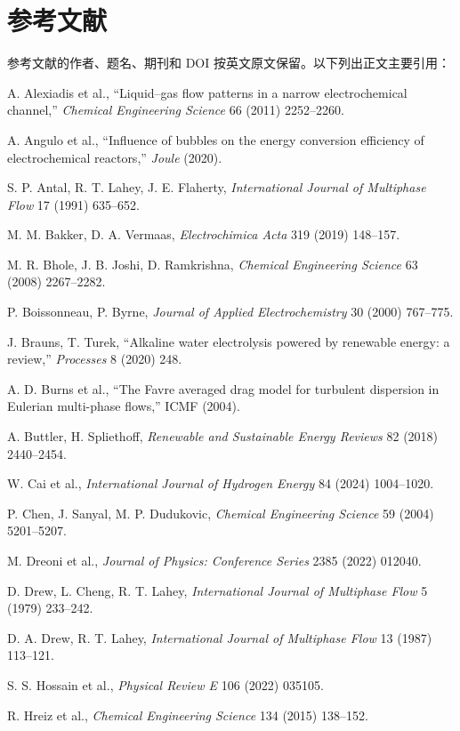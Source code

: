 \documentclass[UTF8,zihao=-4,fontset=fandol]{ctexart}
\begin{document}
\section*{参考文献}
\small
参考文献的作者、题名、期刊和 DOI 按英文原文保留。以下列出正文主要引用：
\begin{enumerate}[label={[\arabic*]},leftmargin=2.7em,itemsep=0.12em]
\item A. Alexiadis et al., ``Liquid--gas flow patterns in a narrow electrochemical channel,'' \emph{Chemical Engineering Science} 66 (2011) 2252--2260.
\item A. Angulo et al., ``Influence of bubbles on the energy conversion efficiency of electrochemical reactors,'' \emph{Joule} (2020).
\item S. P. Antal, R. T. Lahey, J. E. Flaherty, \emph{International Journal of Multiphase Flow} 17 (1991) 635--652.
\item M. M. Bakker, D. A. Vermaas, \emph{Electrochimica Acta} 319 (2019) 148--157.
\item M. R. Bhole, J. B. Joshi, D. Ramkrishna, \emph{Chemical Engineering Science} 63 (2008) 2267--2282.
\item P. Boissonneau, P. Byrne, \emph{Journal of Applied Electrochemistry} 30 (2000) 767--775.
\item J. Brauns, T. Turek, ``Alkaline water electrolysis powered by renewable energy: a review,'' \emph{Processes} 8 (2020) 248.
\item A. D. Burns et al., ``The Favre averaged drag model for turbulent dispersion in Eulerian multi-phase flows,'' ICMF (2004).
\item A. Buttler, H. Spliethoff, \emph{Renewable and Sustainable Energy Reviews} 82 (2018) 2440--2454.
\item W. Cai et al., \emph{International Journal of Hydrogen Energy} 84 (2024) 1004--1020.
\item P. Chen, J. Sanyal, M. P. Dudukovic, \emph{Chemical Engineering Science} 59 (2004) 5201--5207.
\item M. Dreoni et al., \emph{Journal of Physics: Conference Series} 2385 (2022) 012040.
\item D. Drew, L. Cheng, R. T. Lahey, \emph{International Journal of Multiphase Flow} 5 (1979) 233--242.
\item D. A. Drew, R. T. Lahey, \emph{International Journal of Multiphase Flow} 13 (1987) 113--121.
\item S. S. Hossain et al., \emph{Physical Review E} 106 (2022) 035105.
\item R. Hreiz et al., \emph{Chemical Engineering Science} 134 (2015) 138--152.

\end{enumerate}
\end{document}
